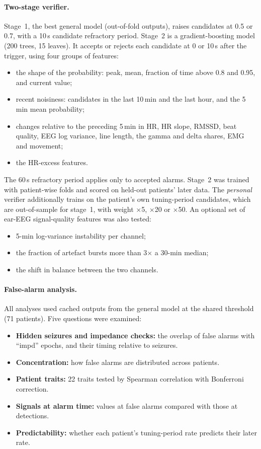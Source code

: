 \paragraph{Two-stage verifier.} Stage~1, the best general model (out-of-fold outputs), raises candidates at 0.5 or 0.7, with a 10\,s candidate refractory period. Stage~2 is a gradient-boosting model (200 trees, 15 leaves). It accepts or rejects each candidate at 0 or 10\,s after the trigger, using four groups of features:
\begin{itemize}
\item the shape of the probability: peak, mean, fraction of time above 0.8 and 0.95, and current value;
\item recent noisiness: candidates in the last 10\,min and the last hour, and the 5\,min mean probability;
\item changes relative to the preceding 5\,min in HR, HR slope, RMSSD, beat quality, EEG log variance, line length, the gamma and delta shares, EMG and movement;
\item the HR-excess features.
\end{itemize}
The 60\,s refractory period applies only to accepted alarms. Stage~2 was trained with patient-wise folds and scored on held-out patients' later data. The \emph{personal} verifier additionally trains on the patient's own tuning-period candidates, which are out-of-sample for stage~1, with weight $\times$5, $\times$20 or $\times$50. An optional set of ear-EEG signal-quality features was also tested:
\begin{itemize}
\item 5-min log-variance instability per channel;
\item the fraction of artefact bursts more than 3$\times$ a 30-min median;
\item the shift in balance between the two channels.
\end{itemize}

\paragraph{False-alarm analysis.} All analyses used cached outputs from the general model at the shared threshold (71 patients). Five questions were examined:
\begin{itemize}
\item \textbf{Hidden seizures and impedance checks:} the overlap of false alarms with ``impd'' epochs, and their timing relative to seizures.
\item \textbf{Concentration:} how false alarms are distributed across patients.
\item \textbf{Patient traits:} 22 traits tested by Spearman correlation with Bonferroni correction.
\item \textbf{Signals at alarm time:} values at false alarms compared with those at detections.
\item \textbf{Predictability:} whether each patient's tuning-period rate predicts their later rate.
\end{itemize}

